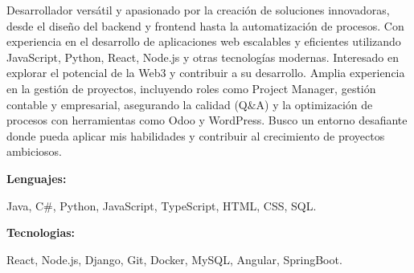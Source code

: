 \documentclass[9pt]{developercv}
\begin{document}
\begin{minipage}[t]{0.46\textwidth}
	\vspace{-6pt}
 
    Desarrollador versátil y apasionado por la creación de soluciones innovadoras, desde el diseño del backend y frontend hasta la automatización de procesos. Con experiencia en el desarrollo de aplicaciones web escalables y eficientes utilizando JavaScript, Python, React, Node.js y otras tecnologías modernas. Interesado en explorar el potencial de la Web3 y contribuir a su desarrollo. Amplia experiencia en la gestión de proyectos, incluyendo roles como Project Manager, gestión contable y empresarial, asegurando la calidad (Q\&A) y la optimización de procesos con herramientas como Odoo y WordPress. Busco un entorno desafiante donde pueda aplicar mis habilidades y contribuir al crecimiento de proyectos ambiciosos.
\end{minipage}
\hfill
\begin{minipage}[t]{0.465\textwidth}
    \vspace{-6pt}
    
    \begin{minipage}[t]{0.2\textwidth}
        \textbf{Lenguajes:}
    \end{minipage}
    \hfill
    \begin{minipage}[t]{0.73\textwidth}
      Java, C\#, Python, JavaScript, TypeScript, HTML, CSS, SQL.  
    \end{minipage}
    \vspace{4mm}
    
    \begin{minipage}[t]{0.2\textwidth}
        \textbf{Tecnologias:}
    \end{minipage}
    \hfill
    \begin{minipage}[t]{0.73\textwidth}
      React, Node.js, Django, Git, Docker, MySQL, Angular, SpringBoot.
    \end{minipage}
    
\end{minipage}
\end{document}
